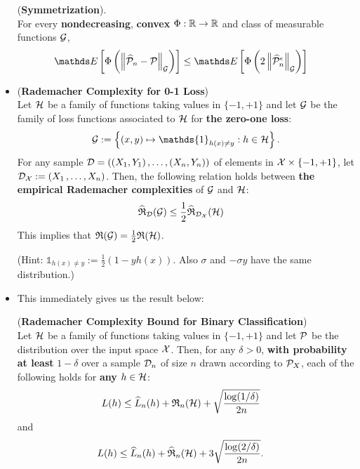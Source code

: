\documentclass[11pt]{article}
\begin{document}
\begin{itemize}
\begin{remark}
\begin{lemma} (\textbf{Symmetrization}). \citep{wellner2013weak}\\
For every \textbf{nondecreasing}, \textbf{convex} $\Phi: {\mathbb R} \to {\mathbb R}$ and class of measurable functions ${\mathcal G}$,
\begin{align*}
\E{}{\Phi\paren{\norm{\widehat{\cP}_n - \cP}{\cG}}} &\le \E{}{\Phi\paren{2\norm{\widehat{\cP}_n^{\epsilon}}{\cG}}}
\end{align*}
\end{lemma}

\end{remark}

\item \begin{lemma} (\textbf{Rademacher Complexity for 0-1 Loss}) \citep{mohri2018foundations}\\
Let ${\mathcal H}$ be a family of functions taking values in $\{-1, +1\}$ and let ${\mathcal G}$ be the family of loss functions associated to ${\mathcal H}$ for \textbf{the zero-one loss}: 
\begin{align*}
\cG := \set{(x,y) \mapsto \mathds{1}_{h(x) \neq y}:  h \in \cH}.
\end{align*}
For any sample ${\mathcal D} = ((X_1, Y_1) \,{,}\ldots{,}\, (X_n, Y_n))$ of elements in ${\mathcal X} \times \{-1, +1\}$, let ${\mathcal D}_{{\mathcal X}} := (X_1 \,{,}\ldots{,}\, X_n)$. Then, the following relation holds between \textbf{the empirical Rademacher complexities} of ${\mathcal G}$ and ${\mathcal H}$:
\begin{align*}
\widehat{{\mathfrak R}}_{{\mathcal D}}({\mathcal G}) &\le \frac{1}{2}\widehat{{\mathfrak R}}_{{\mathcal D}_{{\mathcal X}}}({\mathcal H})
\end{align*} This implies that ${\mathfrak R}({\mathcal G}) = \frac{1}{2}{\mathfrak R}({\mathcal H})$. 
\end{lemma} (Hint: $ \mathds{1}_{h(x) \neq y} := \frac{1}{2}(1 - y h(x))$. Also $\sigma$ and $-\sigma y$ have the same distribution.)

\item This immediately gives us the result below:
\begin{proposition} \label{prop: generalization_bound_Rademacher} (\textbf{Rademacher Complexity Bound for Binary Classification})\citep{mohri2018foundations}\\
Let ${\mathcal H}$ be a family of functions taking values in $\{-1, +1\}$  and let ${\mathcal P}$ be the distribution over the input space ${\mathcal X}$. Then, for any $\delta > 0$, \textbf{with probability at least} $1 - \delta$ over a sample ${\mathcal D}_{n}$ of size $n$ drawn according to ${\mathcal P}_{X}$, each of the following holds for \textbf{any} $h \in {\mathcal H}$:
\begin{align}
L(h) &\le \widehat{L}_{n}(h) + {\mathfrak R}_{n}({\mathcal H}) + \sqrt{\frac{\log(1 / \delta)}{2n}}  \label{eqn: Rademacher_binary_loss_bound_1}
\end{align} and
\begin{align}
L(h) &\le \widehat{L}_{n}(h) + \widehat{{\mathfrak R}}_{n}({\mathcal H}) +  3\sqrt{\frac{\log(2 / \delta)}{2n}}.  \label{eqn: Rademacher_binary_loss_bound_2}
\end{align}
\end{proposition}


\end{itemize}
\end{document}
